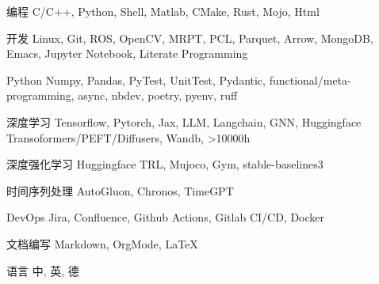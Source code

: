 \documentclass[../cv_cn.tex]{subfiles}
\begin{document}


\begin{cvskills}

  \cvskill
    {编程} %
    {C/C++, Python, Shell, Matlab, CMake, Rust, Mojo, Html} %

  \cvskill
    {开发} %
    {Linux, Git, ROS, OpenCV, MRPT, PCL, Parquet, Arrow, MongoDB, Emacs, Jupyter Notebook, Literate Programming} %

  \cvskill
    {Python} %
    {Numpy, Pandas, PyTest, UnitTest, Pydantic, functional/meta-programming, async, nbdev, poetry, pyenv, ruff} %

  \cvskill
    {深度学习} %
    {Tensorflow, Pytorch, Jax, LLM, Langchain, GNN, Huggingface Transoformers/PEFT/Diffusers, Wandb, >10000h} %

  \cvskill
    {深度强化学习} %
    {Huggingface TRL, Mujoco, Gym, stable-baselines3} %

  \cvskill
    {时间序列处理} %
    {AutoGluon, Chronos, TimeGPT} %

  \cvskill
    {DevOps} %
    {Jira, Confluence, Github Actions, Gitlab CI/CD, Docker} %

  \cvskill
    {文档编写} %
    {Markdown, OrgMode, LaTeX} %

  \cvskill
    {语言} %
    {中, 英, 德} %

\end{cvskills}
\end{document}
